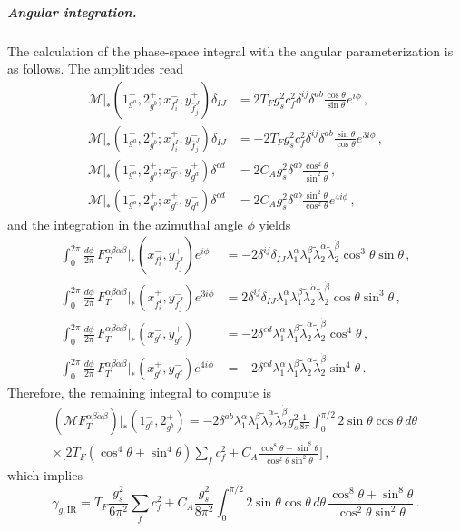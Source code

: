 \subparagraph{Angular integration.}
The calculation of the phase-space integral with the angular parameterization is as follows.
The amplitudes read
\begin{align}
    \mathcal M|_*(1^-_{g^a},2^+_{g^b};x_{f_i^I}^{-},y_{\bar f_j^J}^{+})\delta_{IJ} &= 2T_Fg_s^2c_f^2\delta^{ij}\delta^{ab}\frac{\cos\theta}{\sin\theta}e^{i\phi}\,, \\
    \mathcal M|_*(1^-_{g^a},2^+_{g^b};x_{f_i^I}^{+},y_{\bar f_j^J}^{-})\delta_{IJ} &= -2T_Fg_s^2c_f^2\delta^{ij}\delta^{ab}\frac{\sin\theta}{\cos\theta}e^{3i\phi}\,,\\
    \mathcal M|_* (1^-_{g^a},2^+_{g^b};x_{g^c}^{-},y_{g^d}^{+}) \delta^{cd} &= 2C_A g_s^2\delta^{ab}\frac{\cos^2\theta}{\sin^2\theta}\,, \\
    \mathcal M|_* (1^-_{g^a},2^+_{g^b};x_{g^c}^{+},y_{g^d}^{-}) \delta^{cd} &= 2C_A g_s^2\delta^{ab}\frac{\sin^2\theta}{\cos^2\theta}e^{4i\phi}\,,
\end{align}
and the integration in the azimuthal angle $\phi$ yields
\begin{align}
    \int_0^{2\pi}\frac{d\phi}{2\pi}\,F_T^{\alpha\beta\dot\alpha\dot\beta}|_{*}(x_{f_i^I}^{-},y_{\bar f_j^J}^{+})e^{i\phi} &= -2\delta^{ij}\delta_{IJ}\lambda_1^\alpha \lambda_1^\beta \tilde\lambda_2^{\dot\alpha} \tilde\lambda_2^{\dot\beta}\cos^3\theta\sin\theta\,, \\
    \int_0^{2\pi}\frac{d\phi}{2\pi}\,F_T^{\alpha\beta\dot\alpha\dot\beta}|_{*}(x_{f_i^I}^{+},y_{\bar f_j^J}^{-})e^{3i\phi} &=2\delta^{ij}\delta_{IJ}\lambda_1^\alpha \lambda_1^\beta \tilde\lambda_2^{\dot\alpha} \tilde\lambda_2^{\dot\beta} \cos\theta\sin^3\theta\,, \\
    \int_0^{2\pi}\frac{d\phi}{2\pi}\,F_T^{\alpha\beta\dot\alpha\dot\beta}|_{*}(x_{g^c}^{-},y_{g^d}^{+}) &= -2\delta^{cd}\lambda_1^\alpha \lambda_1^\beta \tilde\lambda_2^{\dot\alpha} \tilde\lambda_2^{\dot\beta}\cos^4\theta\,, \\
    \int_0^{2\pi}\frac{d\phi}{2\pi}\,F_T^{\alpha\beta\dot\alpha\dot\beta}|_{*}(x_{g^c}^{+},y_{g^d}^{-})e^{4i\phi} &= -2\delta^{cd}\lambda_1^\alpha \lambda_1^\beta \tilde\lambda_2^{\dot\alpha} \tilde\lambda_2^{\dot\beta}\sin^4\theta\,.
\end{align}
Therefore, the remaining integral to compute is
\begin{multline}
    (\mathcal M F_T^{\alpha\beta\dot\alpha\dot\beta})|_{*}(1^-_{g^a},2^+_{g^b}) = -2 \delta^{ab} \lambda_1^\alpha \lambda_1^\beta \tilde\lambda_2^{\dot\alpha} \tilde\lambda_2^{\dot\beta}g_s^2\frac{1}{8\pi}\int_0^{\pi/2}2\sin\theta\cos\theta \,d\theta \,\\ \times \bigg[2T_F(\cos^4\theta + \sin^4\theta)\sum_f c_f^2 + C_A\frac{\cos^8\theta + \sin^8\theta}{\cos^2\theta \sin^2\theta}\bigg]\,,
\end{multline}
which implies
\begin{equation}\label{eq:gammaIRgluon_angular}
    \gamma_{g,\text{IR}} =T_F\frac{g_s^2}{6\pi^2}\sum_f c_f^2 +C_A\frac{g_s^2}{8\pi^2}\int_0^{\pi/2}2\sin\theta\cos\theta \,d\theta \, \frac{\cos^8\theta + \sin^8\theta}{\cos^2\theta \sin^2\theta} \,.
\end{equation}

